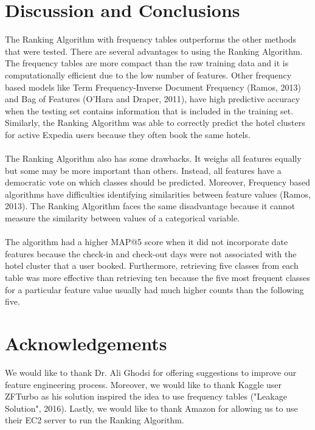 \documentclass[12pt]{report}
\begin{document}
{\let\clearpage\relax \chapter{Discussion and Conclusions}}
The Ranking Algorithm with frequency tables outperforms the other methods that were tested. There are several advantages to using the Ranking Algorithm. The frequency tables are more compact than the raw training data and it is computationally efficient due to the low number of features. Other frequency based models like Term Frequency-Inverse Document Frequency (Ramos, 2013) and Bag of Features (O'Hara and Draper, 2011), have high predictive accuracy when the testing set contains information that is included in the training set. Similarly, the Ranking Algorithm was able to correctly predict the hotel clusters for active Expedia users because they often book the same hotels.\\ \\
The Ranking Algorithm also has some drawbacks. It weighs all features equally but some may be more important than others. Instead, all features have a democratic vote on which classes should be predicted. Moreover, Frequency based algorithms have difficulties identifying similarities between feature values (Ramos, 2013). The Ranking Algorithm faces the same disadvantage because it cannot measure the similarity between values of a categorical variable.\\ \\
The algorithm had a higher MAP@5 score when it did not incorporate date features because the check-in and check-out days were not associated with the hotel cluster that a user booked. Furthermore, retrieving five classes from each table was more effective than retrieving ten because the five most frequent classes for a particular feature value usually had much higher counts than the following five.
 
{\let\clearpage\relax \chapter*{Acknowledgements}}
We would like to thank Dr. Ali Ghodsi for offering suggestions to improve our feature engineering process. Moreover, we would like to thank Kaggle user ZFTurbo as his solution inspired the idea to use frequency tables ("Leakage Solution", 2016). Lastly, we would like to thank Amazon for allowing us to use their EC2 server to run the Ranking Algorithm.
\end{document}
